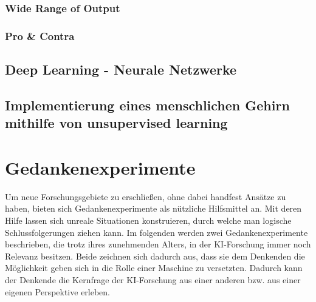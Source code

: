 \documentclass[12pt,german,ngerman]{report}
\begin{document}
        \subsection{Wide Range of Output}
        \subsection{Pro \& Contra}

    \section{Deep Learning - Neurale Netzwerke}
        \section{Implementierung eines menschlichen Gehirn mithilfe von unsupervised learning}

\chapter{Gedankenexperimente}
    Um neue Forschungsgebiete zu erschließen, ohne dabei handfest Ansätze zu haben,
    bieten sich Gedankenexperimente als nützliche Hilfsmittel an.
    Mit deren Hilfe lassen sich unreale Situationen konstruieren, durch welche man logische Schlussfolgerungen ziehen kann.
    Im folgenden werden zwei Gedankenexperimente beschrieben, die trotz ihres zunehmenden Alters, in der KI-Forschung
    immer noch Relevanz besitzen. Beide zeichnen sich dadurch aus, dass sie dem Denkenden die Möglichkeit geben sich in die
    Rolle einer Maschine zu versetzten. Dadurch kann der Denkende die Kernfrage der KI-Forschung aus einer anderen
    bzw. aus einer eigenen Perspektive erleben. 
\end{document}
